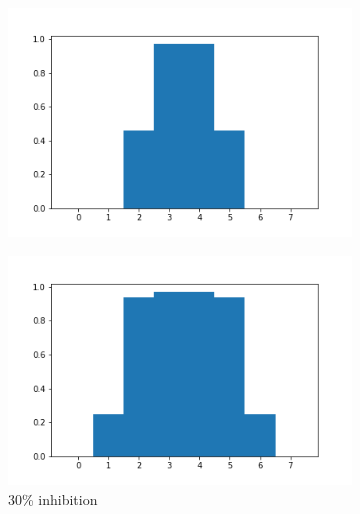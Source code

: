 \documentclass{article}
\begin{document}
\begin{figure}[h]
	\centering
	\begin{subfigure}[t]{0.32\linewidth}
		\centering
		\includegraphics[width = 1.0\linewidth, trim={20 20 20 20}, clip=true]{../figures/D7_inhib_10.png}
		\label{fig:F}	
	\end{subfigure}
	\hspace{0.001\linewidth}
	\begin{subfigure}[t]{0.32\linewidth}
		\centering
		\includegraphics[width = 1.0\linewidth, trim={20 20 20 20}, clip=true]{../figures/D7_inhib_06.png}
		\caption{30\% inhibition}
		\label{fig:dF}
	\end{subfigure}
	\hspace{0.001\linewidth}
	\begin{subfigure}[t]{0.32\linewidth}
		\centering

\end{subfigure}
\end{figure}
\end{document}

